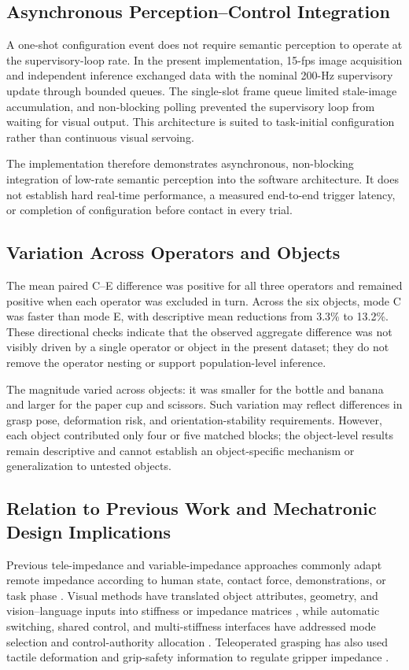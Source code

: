 \subsection{Asynchronous Perception--Control Integration}
A one-shot configuration event does not require semantic perception to operate at the supervisory-loop rate. In the present implementation, 15-fps image acquisition and independent inference exchanged data with the nominal 200-Hz supervisory update through bounded queues. The single-slot frame queue limited stale-image accumulation, and non-blocking polling prevented the supervisory loop from waiting for visual output. This architecture is suited to task-initial configuration rather than continuous visual servoing.

The implementation therefore demonstrates asynchronous, non-blocking integration of low-rate semantic perception into the software architecture. It does not establish hard real-time performance, a measured end-to-end trigger latency, or completion of configuration before contact in every trial.

\subsection{Variation Across Operators and Objects}
The mean paired C--E difference was positive for all three operators and remained positive when each operator was excluded in turn. Across the six objects, mode C was faster than mode E, with descriptive mean reductions from 3.3\% to 13.2\%. These directional checks indicate that the observed aggregate difference was not visibly driven by a single operator or object in the present dataset; they do not remove the operator nesting or support population-level inference.

The magnitude varied across objects: it was smaller for the bottle and banana and larger for the paper cup and scissors. Such variation may reflect differences in grasp pose, deformation risk, and orientation-stability requirements. However, each object contributed only four or five matched blocks; the object-level results remain descriptive and cannot establish an object-specific mechanism or generalization to untested objects.

\subsection{Relation to Previous Work and Mechatronic Design Implications}
Previous tele-impedance and variable-impedance approaches commonly adapt remote impedance according to human state, contact force, demonstrations, or task phase \cite{ref06,ref07,ref08,ref09,ref18,ref19,ref20,ref21}. Visual methods have translated object attributes, geometry, and vision--language inputs into stiffness or impedance matrices \cite{ref10,ref11,ref13,ref14}, while automatic switching, shared control, and multi-stiffness interfaces have addressed mode selection and control-authority allocation \cite{ref12,ref15,ref16,ref23,ref24}. Teleoperated grasping has also used tactile deformation and grip-safety information to regulate gripper impedance \cite{ref30}.


